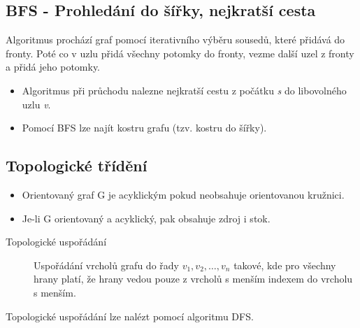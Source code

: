   \subsection{BFS - Prohledání do šířky, nejkratší cesta}
    Algoritmus prochází graf pomocí iterativního výběru sousedů, které přidává do fronty. Poté co v uzlu přidá všechny potomky do fronty, vezme další uzel z fronty a přidá jeho potomky.

    \begin{itemize}
      \item Algoritmus při průchodu nalezne nejkratší cestu z počátku \emph{s} do libovolného uzlu \emph{v}.
      \item Pomocí BFS lze najít kostru grafu (tzv. kostru do šířky).
    \end{itemize}

  \subsection{Topologické třídění}
    \begin{itemize}
      \item Orientovaný graf G je acyklickým pokud neobsahuje orientovanou kružnici.
      \item Je-li G orientovaný a acyklický, pak obsahuje zdroj i stok.
    \end{itemize}

    \begin{description}
      \item[Topologické uspořádání] Uspořádání vrcholů grafu do řady $v_1, v_2, \dots, v_n$ takové, kde pro všechny hrany platí, že hrany vedou pouze z vrcholů s menším indexem do vrcholu s menším.
    \end{description}

    Topologické uspořádání lze nalézt pomocí algoritmu DFS.
